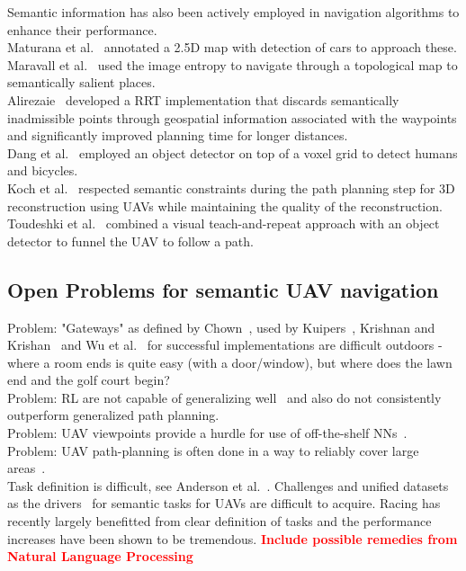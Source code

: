 \documentclass[twocolumn,letterpaper]{IEEEAerospaceCLS}  %
\newcommand\todo[1]{\textbf{\textcolor{red}{#1}}}
\begin{document}
Semantic information has also been actively employed in navigation algorithms to enhance their performance.\\
Maturana et al.~\cite{maturana_looking_2017} annotated a 2.5D map with detection of cars to approach these.\\
Maravall et al.~\cite{maravall_navigation_2017} used the image entropy to navigate through a topological map to semantically salient places.\\
Alirezaie~\cite{alirezaie_exploiting_2017} developed a RRT implementation that discards semantically inadmissible points through geospatial information associated with the waypoints and significantly improved planning time for longer distances.\\
Dang et al.~\cite{dang_autonomous_2018} employed an object detector on top of a voxel grid to detect humans and bicycles.\\
Koch et al.~\cite{koch_automatic_2019} respected semantic constraints during the path planning step for 3D reconstruction using UAVs while maintaining the quality of the reconstruction.
Toudeshki et al.~\cite{toudeshki_robust_2018} combined a visual teach-and-repeat approach with an object detector to funnel the UAV to follow a path.
\subsection{Open Problems for semantic UAV navigation} \label{ssec:ResOpen}
Problem: "Gateways" as defined by Chown~\cite{chown_prototypes_1995}, used by Kuipers~\cite{kuipers_local_2004}, Krishnan and Krishan~\cite{krishnan_visual_2010} and Wu et al.~\cite{wu_learning_2018} for successful implementations are difficult outdoors - where a room ends is quite easy (with a door/window), but where does the lawn end and the golf court begin? \\
Problem: RL are not capable of generalizing well~\cite{chaplot_object_2020} and also do not consistently outperform generalized path planning.\\
Problem: UAV viewpoints provide a hurdle for use of off-the-shelf NNs~\cite{richardwebster_psyphy:_2019}.\\
Problem: UAV path-planning is often done in a way to reliably cover large areas~\cite{vanegas_novel_2018}.\\
Task definition is difficult, see Anderson et al.~\cite{anderson_evaluation_2018}.
Challenges and unified datasets as the drivers~\cite{corke_what_2020} for semantic tasks for UAVs are difficult to acquire. Racing has recently largely benefitted from clear definition of tasks and the performance increases have been shown to be tremendous.
\todo{Include possible remedies from Natural Language Processing}
\end{document}
